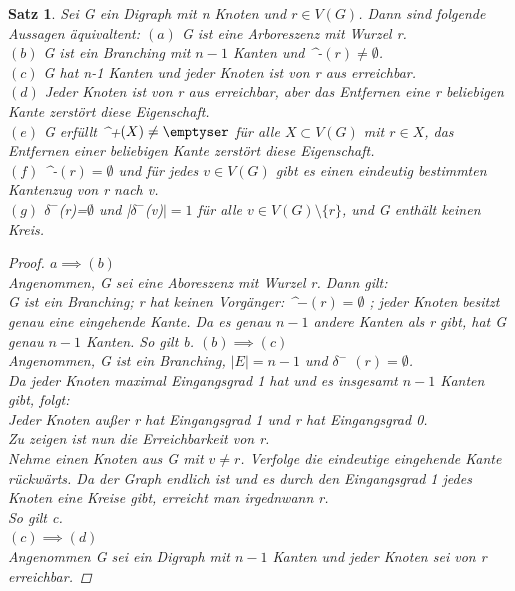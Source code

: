 \documentclass{article}
\newtheorem{satz}{Satz}
\begin{document}
  \begin{satz} \lable
    Sei G ein Digraph mit n Knoten und $r \in V(G)$.
    Dann sind folgende Aussagen äquivaltent:
    $(a)$ G ist eine Arboreszenz mit Wurzel r.\\
    $(b)$ G ist ein Branching mit $n-1$ Kanten und $ $\delta^-$(r)\neq \emptyset $.\\
    $(c)$ G hat n-1 Kanten und jeder Knoten ist von r aus erreichbar.\\
    $(d)$ Jeder Knoten ist von r aus erreichbar, aber das Entfernen eine r beliebigen Kante zerstört diese Eigenschaft.\\
    $(e)$ G erfüllt $ $\delta^+$(X) \neq \emptyser $ für alle $X \subset V(G)$ mit $r \in X$, das Entfernen einer beliebigen Kante zerstört diese Eigenschaft.\\
    $(f)$ $ $\delta^-$(r) =\emptyset $ und für jedes $v \in V(G)$ gibt es einen eindeutig bestimmten Kantenzug von r nach v.\\
    $(g)$ $\delta^-$(r)=$\emptyset$ und |$\delta^-$(v)$|=1$ für alle $v\in V(G) \setminus \{r\} $, und G enthält keinen Kreis.\\
    \begin{proof}
    $a\implies (b)$\\
      Angenommen, G sei eine Aboreszenz mit Wurzel r. Dann gilt:\\
      G ist ein Branching; r hat keinen Vorgänger: $ $\delta^$-(r)=\emptyset $ ; jeder Knoten besitzt genau eine eingehende Kante.
      Da es genau $n-1$ andere Kanten als r gibt, hat G genau $n-1$ Kanten. So gilt b.
    $(b)\implies (c)$\\
      Angenommen, G ist ein Branching, $|E|=n-1$ und $\delta^-$ $(r)=\emptyset$.\\
      Da jeder Knoten maximal Eingangsgrad 1 hat und es insgesamt $n-1$ Kanten gibt, folgt:\\
      Jeder Knoten außer r hat Eingangsgrad 1 und r hat Eingangsgrad 0.\\
      Zu zeigen ist nun die Erreichbarkeit von r.\\
      Nehme einen Knoten aus G mit $v\neq r$. Verfolge die eindeutige eingehende Kante rückwärts.
      Da der Graph endlich ist und es durch den Eingangsgrad 1 jedes Knoten eine Kreise gibt, erreicht man irgednwann r.\\
      So gilt c.\\
    $(c)\implies (d)$ \\  
      Angenommen G sei ein Digraph mit $n-1$ Kanten und jeder Knoten sei von r erreichbar.

\end{proof}
\end{satz}
\end{document}
